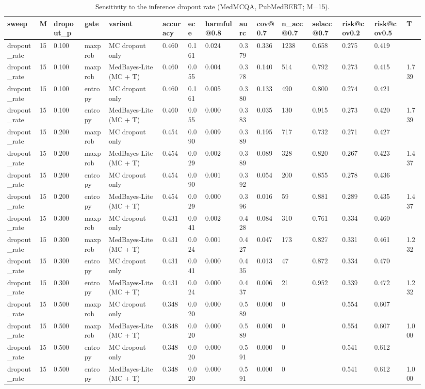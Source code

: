 \begin{table}[htbp]
\centering
\caption{Sensitivity to the inference dropout rate (MedMCQA, PubMedBERT; M=15).}
\label{tab:rev_S2_dropout_rate}
\begin{tabular}{lllllllllllllll}
\toprule
sweep & M & dropout\_p & gate & variant & accuracy & ece & harmful@0.8 & aurc & cov@0.7 & n\_acc@0.7 & selacc@0.7 & risk@cov0.2 & risk@cov0.5 & T \\
\midrule
dropout\_rate & 15 & 0.100 & maxprob & MC dropout only & 0.460 & 0.161 & 0.024 & 0.379 & 0.336 & 1238 & 0.658 & 0.275 & 0.419 &  \\
dropout\_rate & 15 & 0.100 & maxprob & MedBayes-Lite (MC + T) & 0.460 & 0.055 & 0.004 & 0.378 & 0.140 & 514 & 0.792 & 0.273 & 0.415 & 1.739 \\
dropout\_rate & 15 & 0.100 & entropy & MC dropout only & 0.460 & 0.161 & 0.005 & 0.380 & 0.133 & 490 & 0.800 & 0.274 & 0.421 &  \\
dropout\_rate & 15 & 0.100 & entropy & MedBayes-Lite (MC + T) & 0.460 & 0.055 & 0.000 & 0.383 & 0.035 & 130 & 0.915 & 0.273 & 0.420 & 1.739 \\
dropout\_rate & 15 & 0.200 & maxprob & MC dropout only & 0.454 & 0.090 & 0.009 & 0.389 & 0.195 & 717 & 0.732 & 0.271 & 0.427 &  \\
dropout\_rate & 15 & 0.200 & maxprob & MedBayes-Lite (MC + T) & 0.454 & 0.029 & 0.002 & 0.389 & 0.089 & 328 & 0.820 & 0.267 & 0.423 & 1.437 \\
dropout\_rate & 15 & 0.200 & entropy & MC dropout only & 0.454 & 0.090 & 0.001 & 0.392 & 0.054 & 200 & 0.855 & 0.278 & 0.436 &  \\
dropout\_rate & 15 & 0.200 & entropy & MedBayes-Lite (MC + T) & 0.454 & 0.029 & 0.000 & 0.396 & 0.016 & 59 & 0.881 & 0.289 & 0.435 & 1.437 \\
dropout\_rate & 15 & 0.300 & maxprob & MC dropout only & 0.431 & 0.041 & 0.002 & 0.428 & 0.084 & 310 & 0.761 & 0.334 & 0.460 &  \\
dropout\_rate & 15 & 0.300 & maxprob & MedBayes-Lite (MC + T) & 0.431 & 0.024 & 0.001 & 0.427 & 0.047 & 173 & 0.827 & 0.331 & 0.461 & 1.232 \\
dropout\_rate & 15 & 0.300 & entropy & MC dropout only & 0.431 & 0.041 & 0.000 & 0.435 & 0.013 & 47 & 0.872 & 0.334 & 0.470 &  \\
dropout\_rate & 15 & 0.300 & entropy & MedBayes-Lite (MC + T) & 0.431 & 0.024 & 0.000 & 0.437 & 0.006 & 21 & 0.952 & 0.339 & 0.472 & 1.232 \\
dropout\_rate & 15 & 0.500 & maxprob & MC dropout only & 0.348 & 0.020 & 0.000 & 0.589 & 0.000 & 0 &  & 0.554 & 0.607 &  \\
dropout\_rate & 15 & 0.500 & maxprob & MedBayes-Lite (MC + T) & 0.348 & 0.020 & 0.000 & 0.589 & 0.000 & 0 &  & 0.554 & 0.607 & 1.000 \\
dropout\_rate & 15 & 0.500 & entropy & MC dropout only & 0.348 & 0.020 & 0.000 & 0.591 & 0.000 & 0 &  & 0.541 & 0.612 &  \\
dropout\_rate & 15 & 0.500 & entropy & MedBayes-Lite (MC + T) & 0.348 & 0.020 & 0.000 & 0.591 & 0.000 & 0 &  & 0.541 & 0.612 & 1.000 \\
\bottomrule
\end{tabular}
\end{table}
